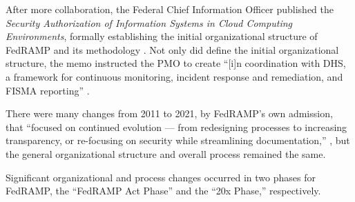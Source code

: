 \documentclass{jdf}
\begin{document}
After more collaboration, the Federal Chief Information Officer published the \textit{Security Authorization of Information Systems in Cloud Computing Environments}, formally establishing the initial organizational structure of FedRAMP and its methodology \cite[p.~241]{metheny17}. Not only did define the initial organizational structure, the memo instructed the PMO to create ``[i]n coordination with DHS, a framework for continuous monitoring, incident response and remediation, and FISMA reporting'' \citeyear[p.~3]{secauthmemo11}.

There were many changes from 2011 to 2021, by FedRAMP's own admission, that ``focused on continued evolution — from redesigning processes to increasing transparency, or re-focusing on security while streamlining documentation,'' \citeyear{fedramp_blog_retrospective21}, but the general organizational structure and overall process remained the same.

Significant organizational and process changes occurred in two phases for FedRAMP, the ``FedRAMP Act Phase'' and the ``20x Phase,'' respectively.
\end{document}
